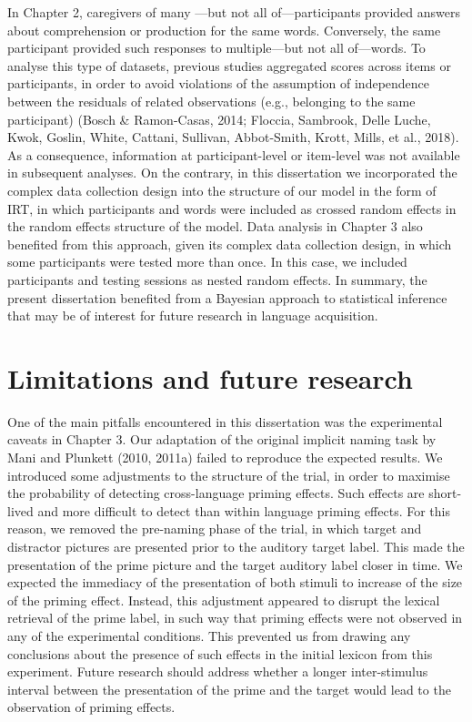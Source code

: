 \documentclass[
  12pt,
  b5paperpaper,
  twoside]{scrreprt}
\begin{document}
In Chapter 2, caregivers of many ---but not all of---participants
provided answers about comprehension or production for the same words.
Conversely, the same participant provided such responses to
multiple---but not all of---words. To analyse this type of datasets,
previous studies aggregated scores across items or participants, in
order to avoid violations of the assumption of independence between the
residuals of related observations (e.g., belonging to the same
participant) (Bosch \& Ramon-Casas, 2014; Floccia, Sambrook, Delle
Luche, Kwok, Goslin, White, Cattani, Sullivan, Abbot-Smith, Krott,
Mills, et al., 2018). As a consequence, information at participant-level
or item-level was not available in subsequent analyses. On the contrary,
in this dissertation we incorporated the complex data collection design
into the structure of our model in the form of IRT, in which
participants and words were included as crossed random effects in the
random effects structure of the model. Data analysis in Chapter 3 also
benefited from this approach, given its complex data collection design,
in which some participants were tested more than once. In this case, we
included participants and testing sessions as nested random effects. In
summary, the present dissertation benefited from a Bayesian approach to
statistical inference that may be of interest for future research in
language acquisition.

\hypertarget{limitations-and-future-research}{%
\section{Limitations and future
research}\label{limitations-and-future-research}}

One of the main pitfalls encountered in this dissertation was the
experimental caveats in Chapter 3. Our adaptation of the original
implicit naming task by Mani and Plunkett (2010, 2011a) failed to
reproduce the expected results. We introduced some adjustments to the
structure of the trial, in order to maximise the probability of
detecting cross-language priming effects. Such effects are short-lived
and more difficult to detect than within language priming effects. For
this reason, we removed the pre-naming phase of the trial, in which
target and distractor pictures are presented prior to the auditory
target label. This made the presentation of the prime picture and the
target auditory label closer in time. We expected the immediacy of the
presentation of both stimuli to increase of the size of the priming
effect. Instead, this adjustment appeared to disrupt the lexical
retrieval of the prime label, in such way that priming effects were not
observed in any of the experimental conditions. This prevented us from
drawing any conclusions about the presence of such effects in the
initial lexicon from this experiment. Future research should address
whether a longer inter-stimulus interval between the presentation of the
prime and the target would lead to the observation of priming effects.
\end{document}
